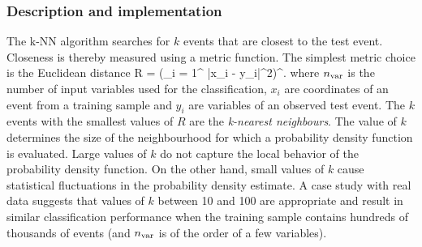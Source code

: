 \subsubsection{Description and implementation}

The k-NN algorithm searches for $k$ events that are closest to the test event. Closeness 
is thereby measured using a metric function. The simplest metric choice is the Euclidean 
distance
\beq
   R = \left(\sum_{i = 1}^{\Nvar} |x_{i} - y_{i}|^{2}\right)^{\!\!}\;.
\eeq
where ${n_\text{var}}$ is the number of input variables used for the classification, $x_{i}$ are 
coordinates of an event from a training sample and $y_{i}$ are variables of an observed 
test event. The $k$ events with the smallest values of $R$ are the {\em k-nearest neighbours}. 
The value of $k$ determines the size of the neighbourhood for which a probability density 
function is evaluated. Large values of $k$ do not capture the local behavior of the 
probability density function. On the other hand, small values of $k$ cause statistical
fluctuations in the probability density estimate. A case study with real data suggests 
that values of $k$ between 10 and 100 are appropriate and result in similar classification 
performance when the training sample contains hundreds of thousands of events (and ${n_\text{var}}$
is of the order of a few variables).

